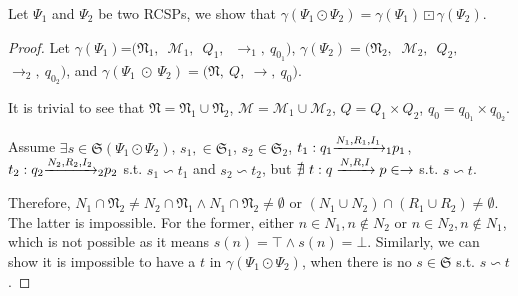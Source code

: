 \begin{theorem}%
Let $\Psi_{1}$ and $\Psi_{2}$ be two RCSPs, we show that $\gamma(\Psi_1 \odot \Psi_2) = \gamma(\Psi_1) \boxdot \gamma(\Psi_2)$.
\end{theorem}
\begin{proof}
Let $\gamma(\Psi_1)$=$(\mathfrak{N}_1,$\ $\mathcal{M}_1,$\ $Q_1,\ $ $\rightarrow_1,\ q_{0_1})$,  $\gamma(\Psi_2)= ($$\mathfrak{N}_2,\ $ $\mathcal{M}_2,$\ $Q_2,\ $ $\rightarrow_2,\ q_{0_2})$, and  $\gamma(\Psi_1\ \odot \  \Psi_2)=(\mathfrak{N},\ $$Q,\ $$\rightarrow,\ q_{0})$.

It is trivial to see that $\mathfrak{N}=\mathfrak{N}_1 \cup \mathfrak{N}_2$, $\mathcal{M}=\mathcal{M}_1 \cup \mathcal{M}_2$, $Q=Q_1 \times Q_2$, $q_0=q_{0_1} \times q_{0_2}$. %

Assume $\exists s \in \mathfrak{S}(\Psi_1 \odot \Psi_2)$, $s_1,\in \mathfrak{S}_1$, $s_2 \in \mathfrak{S}_2$, $t_1:q_1{\xrightarrow{N_1, R_1, I_1}_{1}}p_1$, $t_2:q_2{\xrightarrow{N_2, R_2, I_2}_{2}}p_2$ s.t. $s_1 \backsim t_1$ and $s_2 \backsim t_2$, but $\nexists \  t:q\xrightarrow{N,R,I}p \in \rightarrow$ s.t. $s \backsim t$.

\vspace{.3cm}
Therefore, $N_1 \cap \mathfrak{N}_2 \neq N_2 \cap \mathfrak{N}_1 \wedge N_1 \cap \mathfrak{N}_2 \neq \emptyset$ or $(N_1\cup N_2)\cap(R_1\cup R_2)\neq\emptyset$. The latter is impossible. For the former,  %
either
$n \in N_1, n \notin N_2$ or $n \in N_2, n \notin N_1$, which is not possible as it means $s(n)=\top \wedge s(n)=\bot$.
Similarly, we can show it is impossible to have a $t$ in $\gamma(\Psi_1 \odot \Psi_2)$, when there is no $s \in \mathfrak{S}$ s.t. $s \backsim t$.
%
%
\end{proof}
